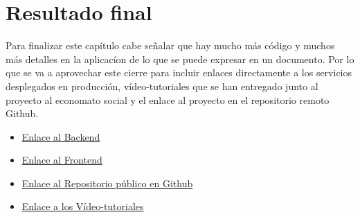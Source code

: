 \section{Resultado final}
Para finalizar este capítulo cabe señalar que hay mucho más código y muchos más detalles en la aplicacíon de lo que se puede expresar en un documento. Por lo que se va a aprovechar este cierre para incluir enlaces directamente a los servicios desplegados en producción, vídeo-tutoriales que se han entregado junto al proyecto al economato social y el enlace al proyecto en el repositorio remoto Github.
\begin{itemize}
    \item \href{https://economato-social-api.herokuapp.com}{Enlace al Backend} \citep{BACKEND}
    \item \href{ttps://economato-social.herokuapp.com}{Enlace al Frontend} \citep{FRONTEND}
    \item \href{https://github.com/DiegoMGar/TFG}{Enlace al Repositorio público en Github}  \citep{REPOSITORIO}
    \item \href{https://drive.google.com/drive/folders/1pv-6iishQkM29StiSHUyY74lWEVx0t6q}{Enlace a los Vídeo-tutoriales} \citep{VIDEOTUTORIALES}
\end{itemize}
